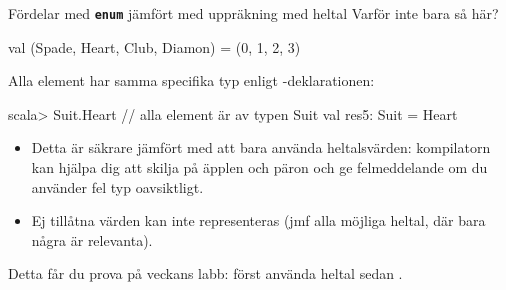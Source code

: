 \begin{Slide}{Fördelar med \texttt{\textbf{enum}} jämfört med uppräkning med heltal}
Varför inte bara så här?
\begin{Code}
val (Spade, Heart, Club, Diamon) = (0, 1, 2, 3)  
\end{Code}  
Alla element har samma specifika typ enligt -deklarationen:  
\begin{REPL}
scala> Suit.Heart              // alla element är av typen Suit 
val res5: Suit = Heart
\end{REPL}

\begin{itemize}
\item Detta är säkrare jämfört med att bara använda heltalsvärden: kompilatorn kan hjälpa dig att skilja på äpplen och päron och ge felmeddelande om du använder fel typ oavsiktligt. 
\item Ej tillåtna värden kan inte representeras (jmf alla möjliga heltal, där bara några är relevanta).
\end{itemize}  
Detta får du prova på veckans labb: först använda heltal sedan .
\end{Slide}